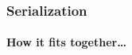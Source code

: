 \documentclass[compress,table,xcolor=table]{beamer}
\begin{document}
\begin{frame}[fragile]
  \frametitle{Serialization}
  \framesubtitle{How it fits together\ldots}
  \begin{columns}
    \begin{column}{.50\textwidth}
      \colorbox{gray}{
        \begin{minipage}{\dimexpr\textwidth\relax}
        \centering

\end{minipage}}
\end{column}
\end{columns}
\end{frame}
\end{document}
